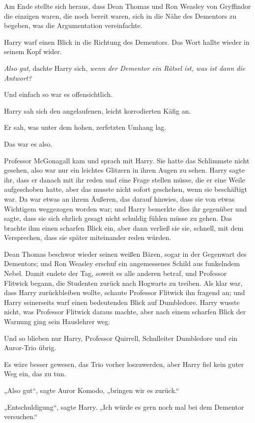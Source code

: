 {Am Ende stellte sich heraus, dass Dean Thomas und Ron Weasley von Gryffindor die einzigen waren, die noch bereit waren, sich in die Nähe des Dementors zu begeben, was die Argumentation vereinfachte.

Harry warf einen Blick in die Richtung des Dementors. Das Wort hallte wieder in seinem Kopf wider.

\emph{Also gut}, dachte Harry sich, \emph{wenn der Dementor ein Rätsel ist, was ist dann die Antwort?}

Und einfach so war es offensichtlich.

Harry sah sich den angelaufenen, leicht korrodierten Käfig an.

Er sah, was unter dem hohen, zerfetzten Umhang lag.

Das war es also.

Professor McGonagall kam und sprach mit Harry. Sie hatte das Schlimmste nicht gesehen, also war nur ein leichtes Glitzern in ihren Augen zu sehen. Harry sagte ihr, dass er danach mit ihr reden und eine Frage stellen müsse, die er eine Weile aufgeschoben hatte, aber das musste nicht sofort geschehen, wenn sie beschäftigt war. Da war etwas an ihrem Äußeren, das darauf hinwies, dass sie von etwas Wichtigem weggezogen worden war; und Harry bemerkte dies ihr gegenüber und sagte, dass sie sich ehrlich gesagt nicht schuldig fühlen müsse zu gehen. Das brachte ihm einen scharfen Blick ein, aber dann verließ sie sie, schnell, mit dem Versprechen, dass sie später miteinander reden würden.

Dean Thomas beschwor wieder seinen weißen Bären, sogar in der Gegenwart des Dementors; und Ron Weasley erschuf ein angemessenes Schild aus funkelndem Nebel. Damit endete der Tag, soweit es alle anderen betraf, und Professor Flitwick begann, die Studenten zurück nach Hogwarts zu treiben. Als klar war, dass Harry zurückbleiben wollte, schaute Professor Flitwick ihn fragend an; und Harry seinerseits warf einen bedeutenden Blick auf Dumbledore. Harry wusste nicht, was Professor Flitwick daraus machte, aber nach einem scharfen Blick der Warnung ging sein Hauslehrer weg.

Und so blieben nur Harry, Professor Quirrell, Schulleiter Dumbledore und ein Auror-Trio übrig.

Es wäre besser gewesen, das Trio vorher loszuwerden, aber Harry fiel kein guter Weg ein, das zu tun.

„Also gut“, sagte Auror Komodo, „bringen wir es zurück.“

„Entschuldigung“, sagte Harry. „Ich würde es gern noch mal bei dem Dementor versuchen.“

}
